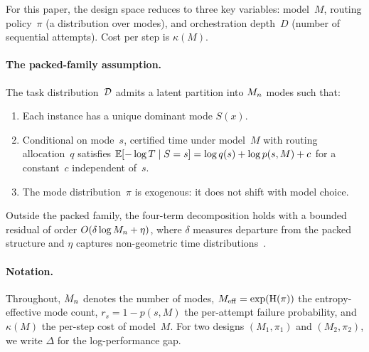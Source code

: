 For this paper, the design space reduces to three key variables: model~$M$, routing policy~$\pi$ (a distribution over modes), and orchestration depth~$D$ (number of sequential attempts).
Cost per step is $\kappa(M)$.

\paragraph{The packed-family assumption.}
\begin{assumption}
\label{ass:packed-family}
The task distribution~$\mathcal{D}$ admits a latent partition into $M_n$ modes such that:
\begin{enumerate}[label=(\roman*)]
  \item Each instance has a unique dominant mode $S(x)$.
  \item Conditional on mode~$s$, certified time under model~$M$ with routing allocation~$q$ satisfies $\mathbb{E}[-\log T \mid S = s] = \log q(s) + \log p(s, M) + c$ for a constant~$c$ independent of~$s$.
  \item The mode distribution~$\pi$ is exogenous: it does not shift with model choice.
\end{enumerate}
\end{assumption}

Outside the packed family, the four-term decomposition holds with a bounded residual of order $O(\delta \log M_n + \eta)$, where $\delta$ measures departure from the packed structure and $\eta$ captures non-geometric time distributions~\citep{beneventano2026framework}.

\paragraph{Notation.}
Throughout, $M_n$ denotes the number of modes, $M_{\mathrm{eff}} = \exp(\mathrm{H}(\pi))$ the entropy-effective mode count, $r_s = 1 - p(s, M)$ the per-attempt failure probability, and $\kappa(M)$ the per-step cost of model~$M$.
For two designs $(M_1, \pi_1)$ and $(M_2, \pi_2)$, we write $\Delta$ for the log-performance gap.
